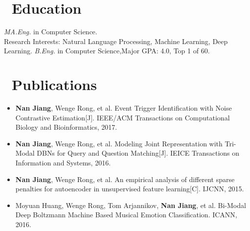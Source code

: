 \documentclass{resume}
\begin{document}



\section{\faGraduationCap\ Education }
\emph{MA.Eng.} in Computer Science. \\
Research Interests: Natural Language Processing, Machine Learning, Deep Learning.
\emph{B.Eng.} in Computer Science,\space Major GPA: 4.0, Top 1 of 60.




\section{\faBook\ Publications }
\begin{itemize}[parsep=0.5ex]
\item \textbf{Nan Jiang}, Wenge Rong, et al. Event Trigger Identification with Noise Contrastive Estimation[J]. IEEE/ACM Transactions on Computational Biology and Bioinformatics, 2017.

\item \textbf{Nan Jiang}, Wenge Rong, et al. Modeling Joint Representation with Tri-Modal DBNs for Query and Question Matching[J]. IEICE Transactions on Information and Systems, 2016.

\item \textbf{Nan Jiang}, Wenge Rong, et al. An empirical analysis of different sparse penalties for autoencoder in unsupervised feature learning[C]. IJCNN, 2015.

\item Moyuan Huang, Wenge Rong, Tom Arjannikov, \textbf{Nan Jiang}, et al. Bi-Modal Deep Boltzmann Machine Based Musical Emotion Classification. ICANN, 2016.

\end{itemize}
\end{document}
